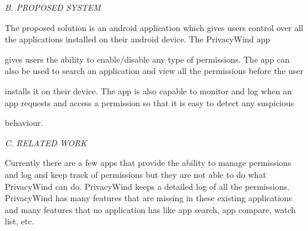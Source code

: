 \documentclass[12pt]{report}
\renewcommand{\_}{\kern-1.5pt\textunderscore\kern-1.5pt}
\begin{document}
\begin{multicols}{2}
\vspace{\baselineskip}
\begin{justify}
{\fontsize{10pt}{12.0pt}\selectfont \textit{B. PROPOSED SYSTEM}}
\end{justify}
\begin{justify}
{\fontsize{10pt}{12.0pt}\selectfont The proposed solution is an android application which gives users control over all the applications installed on their android device. The PrivacyWind app \par}
\end{justify}

\vspace{\baselineskip}
\begin{justify}
{\fontsize{10pt}{12.0pt}\selectfont gives users the ability to enable/disable any type of permissions. The app can also be used to search an application and view all the permissions before the user \par}
\end{justify}
\begin{justify}
{\fontsize{10pt}{12.0pt}\selectfont installs it on their device. The app is also capable to monitor and log when an app requests and access a permission so that it is easy to detect any suspicious \par}
\end{justify}
\begin{justify}
{\fontsize{10pt}{12.0pt}\selectfont behaviour.}
\end{justify}

\vspace{\baselineskip}
\begin{justify}
{\fontsize{10pt}{12.0pt}\selectfont \textit{C. RELATED WORK}}
\end{justify}
\begin{justify}
{\fontsize{10pt}{12.0pt}\selectfont Currently there are a few apps that provide the ability to manage permissions and log and keep track of permissions but they are not able to do what PrivacyWind can do. PrivacyWind keeps a detailed log of all the permissions. PrivacyWind has many features that are missing in these existing applications and many features that no application has like app search, app compare, watch list, etc.\par}
\end{justify}


\end{multicols}
\end{document}
